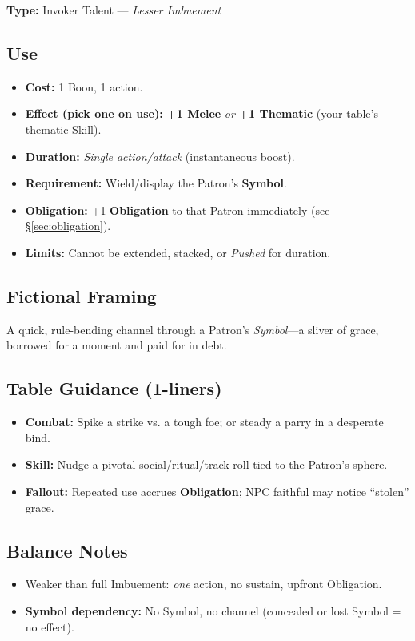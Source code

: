 \textbf{Type:} Invoker Talent — \textit{Lesser Imbuement}

\subsection*{Use}
\begin{itemize}
  \item \textbf{Cost:} 1 Boon, 1 action.
  \item \textbf{Effect (pick one on use):} \textbf{+1 Melee} \emph{or} \textbf{+1 Thematic} (your table’s thematic Skill).
  \item \textbf{Duration:} \textit{Single action/attack} (instantaneous boost).
  \item \textbf{Requirement:} Wield/display the Patron’s \textbf{Symbol}.
  \item \textbf{Obligation:} +1 \textbf{Obligation} to that Patron immediately (see \S\ref{sec:obligation}).
  \item \textbf{Limits:} Cannot be extended, stacked, or \emph{Pushed} for duration.
\end{itemize}

\subsection*{Fictional Framing}
A quick, rule-bending channel through a Patron’s \emph{Symbol}—a sliver of grace, borrowed for a moment and paid for in debt.

\subsection*{Table Guidance (1-liners)}
\begin{itemize}
  \item \textbf{Combat:} Spike a strike vs. a tough foe; or steady a parry in a desperate bind.
  \item \textbf{Skill:} Nudge a pivotal social/ritual/track roll tied to the Patron’s sphere.
  \item \textbf{Fallout:} Repeated use accrues \textbf{Obligation}; NPC faithful may notice “stolen” grace.
\end{itemize}

\subsection*{Balance Notes}
\begin{itemize}
  \item Weaker than full Imbuement: \emph{one} action, no sustain, upfront Obligation.
  \item \textbf{Symbol dependency:} No Symbol, no channel (concealed or lost Symbol = no effect).
\end{itemize}


